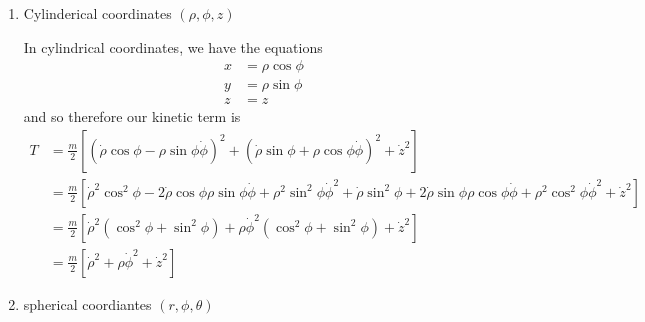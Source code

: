 \documentclass[10pt]{article}
\begin{document}
        \begin{enumerate}[label=(\alph*)]
            \item Cylinderical coordinates $(\rho, \phi, z)$
            
            \begin{solution}
                In cylindrical coordinates, we have the equations
                \begin{align*}
                    x &= \rho \cos \phi\\
                    y &= \rho \sin \phi\\
                    z &= z
                \end{align*}
                and so therefore our kinetic term is
                \begin{align*}
                    T &= \frac{m}{2}\left[ \left(\dot \rho \cos \phi - \rho \sin \phi \dot \phi\right)^2 + \left( \dot \rho \sin \phi + \rho \cos \phi\dot \phi\right)^2 + \dot z^2\right]\\
                    &= \frac{m}{2}\left[ \dot \rho^2 \cos^2 \phi - 2\dot \rho \cos \phi \rho \sin \phi \dot \phi + \rho^2 \sin^2 \phi \dot \phi^2 + \dot\rho \sin^2 \phi  + 2\dot \rho \sin \phi \rho \cos \phi \dot \phi + \rho^2 \cos^2 \phi \dot \phi^2 + \dot z^2\right]\\
                    &= \frac m2\left[ \dot \rho^2 (\cos^2 \phi + \sin^2 \phi) + \rho \dot \phi^2 \left( \cos^2 \phi + \sin^2 \phi\right) + \dot z^2\right]\\
                    &= \frac m2\left[ \dot \rho^2 +  \rho \dot \phi^2 + \dot z^2\right]
                \end{align*}
            \end{solution}
            \item spherical coordiantes $(r, \phi, \theta)$ 


\end{enumerate}
\end{document}
